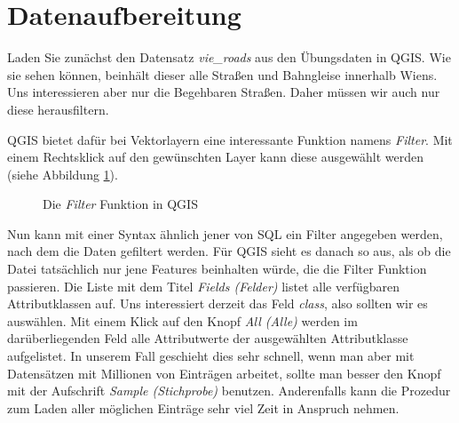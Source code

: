 \documentclass[a4paper,12pt,ngerman]{sphinxmanual}
\begin{document}
\section{Datenaufbereitung}
\label{uebung5:datenaufbereitung}
Laden Sie zunächst den Datensatz \emph{vie\_roads} aus den Übungsdaten in QGIS. Wie sie sehen können, beinhält dieser alle Straßen und Bahngleise innerhalb Wiens.
Uns interessieren aber nur die Begehbaren Straßen. Daher müssen wir auch nur diese herausfiltern.

QGIS bietet dafür bei Vektorlayern eine interessante Funktion namens \emph{Filter}. Mit einem Rechtsklick auf den gewünschten Layer kann diese ausgewählt werden (siehe Abbildung \hyperref[uebung5:figfilter]{ \ref*{uebung5:figfilter}}).
\begin{figure}[htbp]
\centering
\capstart

\caption{Die \emph{Filter} Funktion in QGIS}\label{uebung5:figfilter}\end{figure}

Nun kann mit einer Syntax ähnlich jener von SQL ein Filter angegeben werden, nach dem die Daten gefiltert werden. Für QGIS sieht es danach so aus, als ob die Datei tatsächlich nur jene Features beinhalten würde, die die Filter Funktion passieren.
Die Liste mit dem Titel \emph{Fields (Felder)} listet alle verfügbaren Attributklassen auf. Uns interessiert derzeit das Feld \emph{class}, also sollten wir es auswählen. Mit einem Klick auf den Knopf \emph{All (Alle)} werden im darüberliegenden Feld alle Attributwerte der ausgewählten Attributklasse aufgelistet. In unserem Fall geschieht dies sehr schnell, wenn man aber mit Datensätzen mit Millionen von Einträgen arbeitet, sollte man besser den Knopf mit der Aufschrift \emph{Sample (Stichprobe)} benutzen. Anderenfalls kann die Prozedur zum Laden aller möglichen Einträge sehr viel Zeit in Anspruch nehmen.
\end{document}
